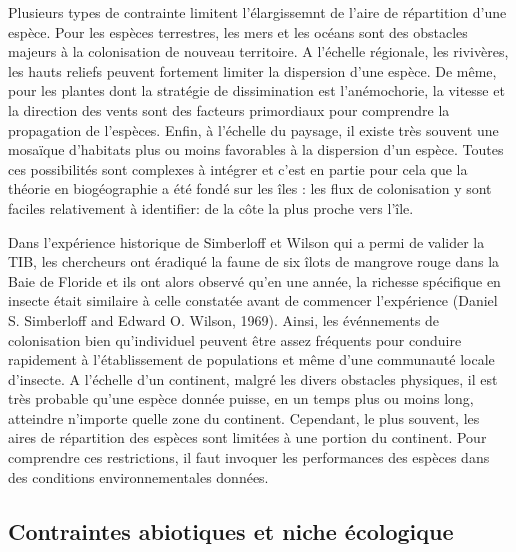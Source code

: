 Plusieurs types de contrainte limitent l'élargissemnt de l'aire de
répartition d'une espèce. Pour les espèces terrestres, les mers et les
océans sont des obstacles majeurs à la colonisation de nouveau
territoire. A l'échelle régionale, les rivivères, les hauts reliefs
peuvent fortement limiter la dispersion d'une espèce. De même, pour les
plantes dont la stratégie de dissimination est l'anémochorie, la vitesse
et la direction des vents sont des facteurs primordiaux pour comprendre
la propagation de l'espèces. Enfin, à l'échelle du paysage, il existe
très souvent une mosaïque d'habitats plus ou moins favorables à la
dispersion d'un espèce. Toutes ces possibilités sont complexes à
intégrer et c'est en partie pour cela que la théorie en biogéographie a
été fondé sur les îles : les flux de colonisation y sont faciles
relativement à identifier: de la côte la plus proche vers l'île.

Dans l'expérience historique de Simberloff et Wilson qui a permi de
valider la TIB, les chercheurs ont éradiqué la faune de six îlots de
mangrove rouge dans la Baie de Floride et ils ont alors observé qu'en
une année, la richesse spécifique en insecte était similaire à celle
constatée avant de commencer l'expérience (Daniel S. Simberloff and
Edward O. Wilson, 1969). Ainsi, les événnements de colonisation bien
qu'individuel peuvent être assez fréquents pour conduire rapidement à
l'établissement de populations et même d'une communauté locale
d'insecte. A l'échelle d'un continent, malgré les divers obstacles
physiques, il est très probable qu'une espèce donnée puisse, en un temps
plus ou moins long, atteindre n'importe quelle zone du continent.
Cependant, le plus souvent, les aires de répartition des espèces sont
limitées à une portion du continent. Pour comprendre ces restrictions,
il faut invoquer les performances des espèces dans des conditions
environnementales données.

\subsection*{Contraintes abiotiques et niche
écologique}\label{contraintes-abiotiques-et-niche-uxe9cologique}

